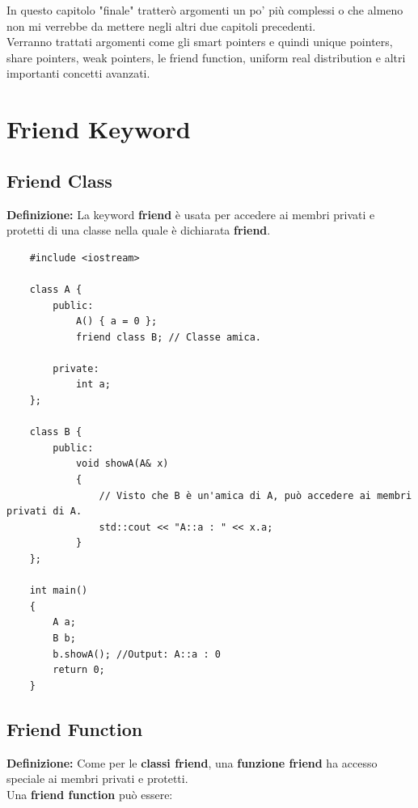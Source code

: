 \textsf{\small In questo capitolo "finale" tratterò argomenti un po' più complessi o che almeno non mi verrebbe da mettere negli altri due capitoli precedenti.} \\

\textsf{\small Verranno trattati argomenti come gli smart pointers e quindi unique pointers, share pointers, weak pointers, le friend function, uniform real distribution e altri importanti concetti avanzati.} \\


\newpage

\section{Friend Keyword}

\subsection{Friend Class}

\textsf{\small \textbf{Definizione: } La keyword \textbf{friend} è usata per accedere ai membri privati e protetti di una classe nella quale è dichiarata \textbf{friend}.} \\

\begin{lstlisting}
	#include <iostream>
	
	class A {
		public:
			A() { a = 0 };
			friend class B; // Classe amica.
			
		private:
			int a;
	};

	class B {
		public:
			void showA(A& x)
			{
				// Visto che B è un'amica di A, può accedere ai membri privati di A.
				std::cout << "A::a : " << x.a; 
			}
	};

	int main()
	{
		A a;
		B b;
		b.showA(); //Output: A::a : 0
		return 0;
	}
\end{lstlisting}

\subsection{Friend Function}

\textsf{\small \textbf{Definizione: } Come per le \textbf{classi friend}, una \textbf{funzione friend} ha accesso speciale ai membri privati e protetti.} \\

\textsf{\small Una \textbf{friend function} può essere: } \\

